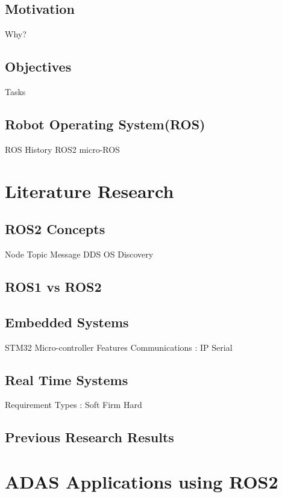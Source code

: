 \documentclass[%
xelatex,
	oneside,		%
	12pt,			%
	parskip=half,	%
	abstracton,
	chapterprefix=true%
    appendixprefix=true]
{scrbook}
\begin{document}
     \section{Motivation}	
			Why?
	 \section{Objectives}
	 Tasks
	 
	 \section{Robot Operating System(ROS)}
	 ROS
	 History
	 ROS2
	 micro-ROS
	
	 
	\chapter{Literature Research}	
		
\rofoot[\pagemark]{\pagemark}
	
	\section{ROS2 Concepts}
	Node
	Topic
	Message
	DDS
	OS
	Discovery

	\section{ROS1 vs ROS2}	

	\section{Embedded Systems}
	STM32 Micro-controller
	Features
	Communications : 
	IP
	Serial
	
	\section{Real Time Systems}
		Requirement
		Types : Soft
		Firm
		Hard
		
	\section{Previous Research Results}

	\chapter{ADAS Applications using ROS2}
		
\rofoot[\pagemark]{\pagemark}
\end{document}
